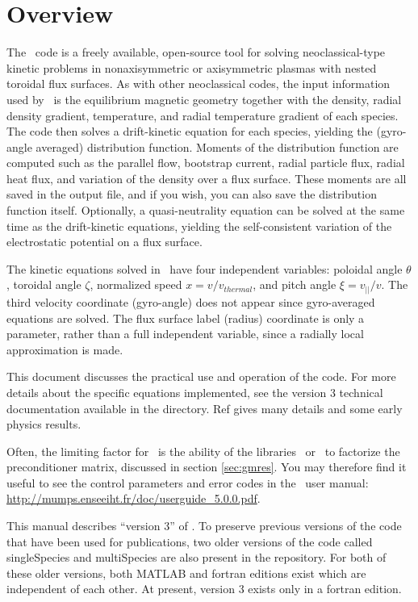 \chapter{Overview}


The \sfincs~code is a freely available, open-source tool for solving neoclassical-type kinetic problems in nonaxisymmetric or axisymmetric plasmas
with nested toroidal flux surfaces.
As with other neoclassical codes, the input information used by \sfincs~is the equilibrium magnetic geometry together with the density, radial density gradient, temperature,
and radial temperature gradient of each species.  The code then solves a drift-kinetic equation for each species,
yielding the (gyro-angle averaged) distribution function.  Moments of the distribution function are computed such as the parallel
flow, bootstrap current, radial particle flux, radial heat flux, and variation of the density over a flux surface.  
These moments are all saved in the output file, and if you wish, you can also save the distribution function itself.
Optionally, a quasi-neutrality
equation can be solved at the same time as the drift-kinetic equations, yielding the self-consistent variation of the electrostatic potential on a flux surface.

The kinetic equations solved in \sfincs~have four independent variables: poloidal angle $\theta$, toroidal angle $\zeta$,
normalized speed $x = v / v_{thermal}$, and pitch angle $\xi = v_{||}/v$.  The third velocity coordinate (gyro-angle) does not appear
since gyro-averaged equations are solved.  The flux surface label (radius) coordinate is only a parameter, rather than a full independent variable,
since a radially local approximation is made.

This document discusses the practical use and operation of the code.  For more details about the specific equations implemented,
see the version 3 technical documentation available in the  directory.
Ref \cite{sfincsPaper} gives many details and some early physics results.

Often, the limiting factor for \sfincs~is the ability of the libraries \mumps~or \superludist~to factorize the preconditioner matrix, discussed in section \ref{sec:gmres}.
You may therefore find it useful to see the control parameters and error codes in the \mumps~user manual:
\url{http://mumps.enseeiht.fr/doc/userguide_5.0.0.pdf}.

This manual describes ``version 3'' of \sfincs.  
To preserve previous versions of the code that have been used for publications, two older versions of the
code called singleSpecies and multiSpecies are also present in the repository.  For both of these older versions,
both MATLAB and fortran editions exist which are independent of each other.  At present, version 3 exists
only in a fortran edition.

